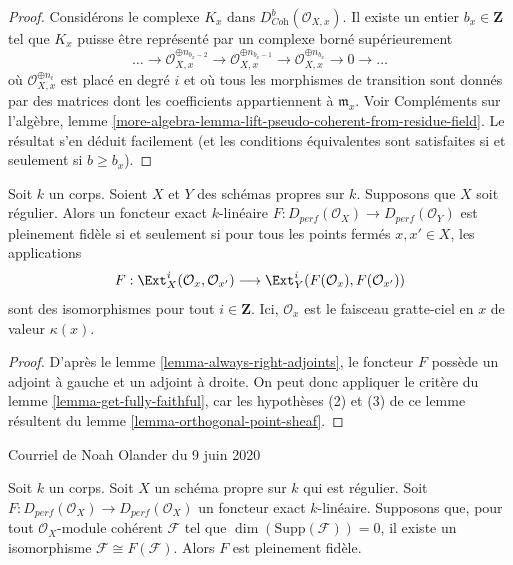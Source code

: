 \begin{proof}
Considérons le complexe $K_x$ dans $D^b_{\textit{Coh}}(\mathcal{O}_{X, x})$.
Il existe un entier $b_x \in \mathbf{Z}$ tel que $K_x$
puisse être représenté par un complexe borné supérieurement
$$
\ldots \to
\mathcal{O}_{X, x}^{\oplus n_{b_x - 2}} \to
\mathcal{O}_{X, x}^{\oplus n_{b_x - 1}} \to
\mathcal{O}_{X, x}^{\oplus n_{b_x}} \to 0 \to \ldots
$$
où $\mathcal{O}_{X, x}^{\oplus n_i}$ est placé en degré $i$
et où tous les morphismes de transition sont donnés par des matrices dont les
coefficients appartiennent à $\mathfrak m_x$. Voir
Compléments sur l'algèbre, lemme
\ref{more-algebra-lemma-lift-pseudo-coherent-from-residue-field}.
Le résultat s'en déduit facilement (et les conditions équivalentes
sont satisfaites si et seulement si $b \geq b_x$).
\end{proof}

\begin{lemma}
\label{lemma-get-fully-faithful-geometric}
Soit $k$ un corps. Soient $X$ et $Y$ des schémas propres sur $k$.
Supposons que $X$ soit régulier. Alors un foncteur exact $k$-linéaire
$F : D_{perf}(\mathcal{O}_X) \to D_{perf}(\mathcal{O}_Y)$
est pleinement fidèle si et seulement si
pour tous les points fermés $x, x' \in X$, les applications
$$
F : \Ext^i_X(\mathcal{O}_x, \mathcal{O}_{x'})
\longrightarrow
\Ext^i_Y(F(\mathcal{O}_x), F(\mathcal{O}_{x'}))
$$
sont des isomorphismes pour tout $i \in \mathbf{Z}$.
Ici, $\mathcal{O}_x$ est le faisceau gratte-ciel en $x$ de valeur $\kappa(x)$.
\end{lemma}

\begin{proof}
D'après le lemme \ref{lemma-always-right-adjoints}, le foncteur $F$
possède un adjoint à gauche et un adjoint à droite. On peut donc appliquer le critère
du lemme \ref{lemma-get-fully-faithful},
car les hypothèses (2) et (3) de ce lemme
résultent du lemme \ref{lemma-orthogonal-point-sheaf}.
\end{proof}

\begin{lemma}
\label{lemma-noah-pre}
\begin{reference}
Courriel de Noah Olander du 9 juin 2020
\end{reference}
Soit $k$ un corps. Soit $X$ un schéma propre sur $k$ qui est régulier.
Soit $F : D_{perf}(\mathcal{O}_X) \to D_{perf}(\mathcal{O}_X)$
un foncteur exact $k$-linéaire. Supposons que, pour tout
$\mathcal{O}_X$-module cohérent $\mathcal{F}$ tel que $\dim(\text{Supp}(\mathcal{F})) = 0$,
il existe un isomorphisme $\mathcal{F} \cong F(\mathcal{F})$.
Alors $F$ est pleinement fidèle.
\end{lemma}


